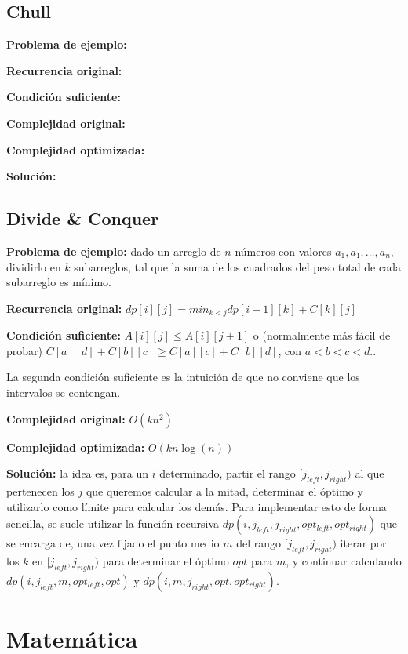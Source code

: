 \subsection{Chull}
{
    \textbf{Problema de ejemplo:} 

    \textbf{Recurrencia original:}

    \textbf{Condición suficiente:} 

    \textbf{Complejidad original:} 

    \textbf{Complejidad optimizada:} 

    \textbf{Solución:} 
}
\subsection{Divide \& Conquer}
{
    \textbf{Problema de ejemplo:} dado un arreglo de $n$ números con valores $a_1, a_1, \dots, a_n$, dividirlo
    en $k$ subarreglos, tal que la suma de los cuadrados del peso total de cada subarreglo es mínimo.

    \textbf{Recurrencia original:} $dp[i][j] = min_{k < j}{dp[i - 1][k] + C[k][j]}$ 

    \textbf{Condición suficiente:} $ A[i][j] \leq A[i][j + 1] $ o (normalmente más fácil de probar) 
    $ C[a][d] + C[b][c] \geq C[a][c] + C[b][d]$, con $a < b < c < d. $.

    La segunda condición suficiente es la intuición de que no conviene que los intervalos se contengan.

    \textbf{Complejidad original:} $O(kn^2)$

    \textbf{Complejidad optimizada:} $O(kn\log(n))$

    \textbf{Solución:} la idea es, para un $i$ determinado, partir el rango $[j_{left}, j_{right})$ al que pertenecen 
    los $j$ que queremos calcular a la mitad, determinar el óptimo y utilizarlo como límite para calcular los demás.
    Para implementar esto de forma sencilla, se suele utilizar la función recursiva $dp(i, j_{left}, j_{right}, opt_{left}, opt_{right})$
    que se encarga de, una vez fijado el punto medio $m$ del rango $[j_{left}, j_{right})$ iterar por los $k$ en $[j_{left}, j_{right})$ 
    para determinar el óptimo $opt$ para $m$, y continuar calculando $dp(i, j_{left}, m, opt_{left}, opt)$ y 
    $dp(i, m, j_{right}, opt, opt_{right})$.

}

\section{Matemática}%
